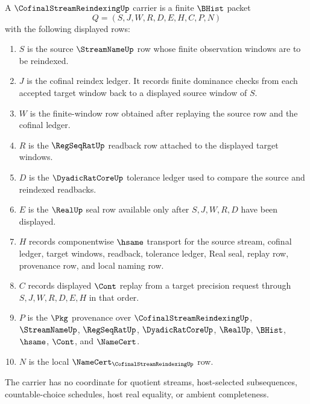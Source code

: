 \begin{definition}
\label{def:cofinal-stream-reindexing-carrier}
A $\CofinalStreamReindexingUp$ carrier is a finite $\BHist$ packet
$$
Q=(S,J,W,R,D,E,H,C,P,N)
$$
with the following displayed rows:
\begin{enumerate}
\item $S$ is the source $\StreamNameUp$ row whose finite observation windows are to be reindexed.
\item $J$ is the cofinal reindex ledger. It records finite dominance checks from each accepted target window back to a displayed source window of $S$.
\item $W$ is the finite-window row obtained after replaying the source row and the cofinal ledger.
\item $R$ is the $\RegSeqRatUp$ readback row attached to the displayed target windows.
\item $D$ is the $\DyadicRatCoreUp$ tolerance ledger used to compare the source and reindexed readbacks.
\item $E$ is the $\RealUp$ seal row available only after $S,J,W,R,D$ have been displayed.
\item $H$ records componentwise $\hsame$ transport for the source stream, cofinal ledger, target windows, readback, tolerance ledger, Real seal, replay row, provenance row, and local naming row.
\item $C$ records displayed $\Cont$ replay from a target precision request through $S,J,W,R,D,E,H$ in that order.
\item $P$ is the $\Pkg$ provenance over $\CofinalStreamReindexingUp$, $\StreamNameUp$, $\RegSeqRatUp$, $\DyadicRatCoreUp$, $\RealUp$, $\BHist$, $\hsame$, $\Cont$, and $\NameCert$.
\item $N$ is the local $\NameCert_{\CofinalStreamReindexingUp}$ row.
\end{enumerate}
The carrier has no coordinate for quotient streams, host-selected subsequences, countable-choice schedules, host real equality, or ambient completeness.
\end{definition}

